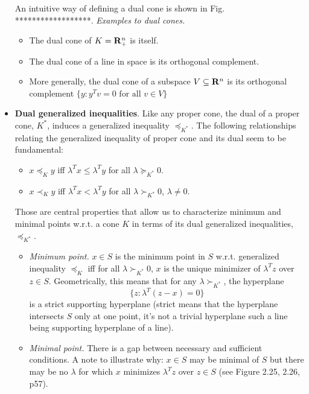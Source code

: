\documentclass[a4paper, oneside]{book}
\begin{document}
\begin{itemize}
An intuitive way of defining a dual cone is shown in Fig. ******************. 
\textit{Examples to dual cones.}
	\begin{itemize}
	\item The dual cone of $K=\mathbf R^n_+$ is itself.
	\item The dual cone of a line in space is its orthogonal complement.
	\item More generally, the dual cone of a subspace $V \subseteq \mathbf R^n$ is its orthogonal complement $\{ y : y^Tv  = 0 \text{ for all } v \in V \}$
	\end{itemize}
\item \textbf{Dual generalized inequalities}. Like any proper cone, the dual of a proper cone, $K^*$, induces a generalized inequality $\preceq_{K^*}$. The following relationships relating the generalized inequality of proper cone and its dual seem to be fundamental:
	\begin{itemize}
	\item $x \preceq_K y$ iff $\lambda^Tx \le \lambda^T y$ for all $\lambda \succeq_{K^*}0$.
	\item $x \prec_K y$ iff $\lambda^Tx < \lambda^T y$ for all $\lambda \succ_{K^*}0$, $\lambda \neq 0$.
	\end{itemize}
Those are central properties that allow us to characterize minimum and minimal points w.r.t. a cone $K$ in terms of its dual generalized inequalities, $\preceq_{K^*}$.
	\begin{itemize}
	\item \textit{Minimum point.} $x \in S$ is the minimum point in $S$ w.r.t. generalized inequality $\preceq_K$ iff for all $\lambda \succ_{K^*} 0$, $x$ is the unique minimizer of $\lambda^T z$ over $z \in S$. Geometrically, this means that for any $\lambda \succ_{K^*}$, the hyperplane 
	$$\{z : \lambda^T (z-x) =0\}$$
	is a strict supporting hyperplane (strict means that the hyperplane intersects $S$ only at one point, \eg it's not a trivial hyperplane such a line being supporting hyperplane of a line).
	\item \textit{Minimal point.}  There is a gap between necessary and sufficient conditions.  A note to illustrate why: $x \in S$ may be minimal of $S$ but there may be no $\lambda$ for which $x$ minimizes $\lambda^T z$ over $z \in S$ (see Figure 2.25, 2.26, p57).

	\end{itemize}
\end{itemize}




\printindex
\end{document}
